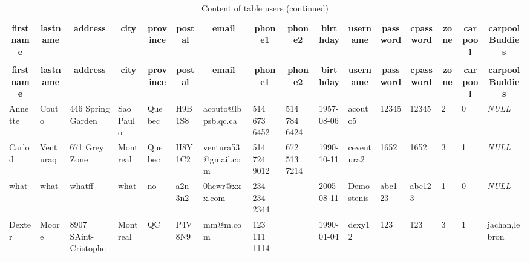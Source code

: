 %
%
 \begin{longtable}{|l|l|l|l|l|l|l|l|l|l|l|l|l|l|l|l|} 
 \hline \endhead \hline \endfoot \hline 
 \caption{Content of table users} \label{tab:users-data} \\\hline \multicolumn{1}{|c|}{\textbf{firstname}} & \multicolumn{1}{|c|}{\textbf{lastname}} & \multicolumn{1}{|c|}{\textbf{address}} & \multicolumn{1}{|c|}{\textbf{city}} & \multicolumn{1}{|c|}{\textbf{province}} & \multicolumn{1}{|c|}{\textbf{postal}} & \multicolumn{1}{|c|}{\textbf{email}} & \multicolumn{1}{|c|}{\textbf{phone1}} & \multicolumn{1}{|c|}{\textbf{phone2}} & \multicolumn{1}{|c|}{\textbf{birthday}} & \multicolumn{1}{|c|}{\textbf{username}} & \multicolumn{1}{|c|}{\textbf{password}} & \multicolumn{1}{|c|}{\textbf{cpassword}} & \multicolumn{1}{|c|}{\textbf{zone}} & \multicolumn{1}{|c|}{\textbf{carpool}} & \multicolumn{1}{|c|}{\textbf{carpoolBuddies}} \\ \hline \hline  \endfirsthead 
\caption{Content of table users (continued)} \\ \hline \multicolumn{1}{|c|}{\textbf{firstname}} & \multicolumn{1}{|c|}{\textbf{lastname}} & \multicolumn{1}{|c|}{\textbf{address}} & \multicolumn{1}{|c|}{\textbf{city}} & \multicolumn{1}{|c|}{\textbf{province}} & \multicolumn{1}{|c|}{\textbf{postal}} & \multicolumn{1}{|c|}{\textbf{email}} & \multicolumn{1}{|c|}{\textbf{phone1}} & \multicolumn{1}{|c|}{\textbf{phone2}} & \multicolumn{1}{|c|}{\textbf{birthday}} & \multicolumn{1}{|c|}{\textbf{username}} & \multicolumn{1}{|c|}{\textbf{password}} & \multicolumn{1}{|c|}{\textbf{cpassword}} & \multicolumn{1}{|c|}{\textbf{zone}} & \multicolumn{1}{|c|}{\textbf{carpool}} & \multicolumn{1}{|c|}{\textbf{carpoolBuddies}} \\ \hline \hline \endhead \endfoot
Annette & Couto & 446 Spring Garden & Sao Paulo & Quebec & H9B 1S8 & acouto@lbpsb.qc.ca & 514 673 6452 & 514 784 6424 & 1957-08-06 & acouto5 & 12345 & 12345 & 2 & 0 & \textit{NULL} \\ \hline 
Carlod & Venturaq & 671 Grey Zone & Montreal & Quebec & H8Y 1C2 & ventura53@gmail.com & 514 724 9012 & 672 513 7214 & 1990-10-11 & ceventura2 & 1652 & 1652 & 3 & 1 & \textit{NULL} \\ \hline 
what & what & whatff & what & no & a2n 3n2 & 0hewr@xxx.com & 234 234 2344 &  & 2005-08-11 & Demostenis & abc123 & abc123 & 1 & 0 & \textit{NULL} \\ \hline 
Dexter & Moore & 8907 SAint-Cristophe & Montreal & QC & P4V 8N9 & mm@m.com & 123 111 1114 &  & 1990-01-04 & dexy12 & 123 & 123 & 3 & 1 & jachan,lebron \\ \hline 

\end{longtable}
